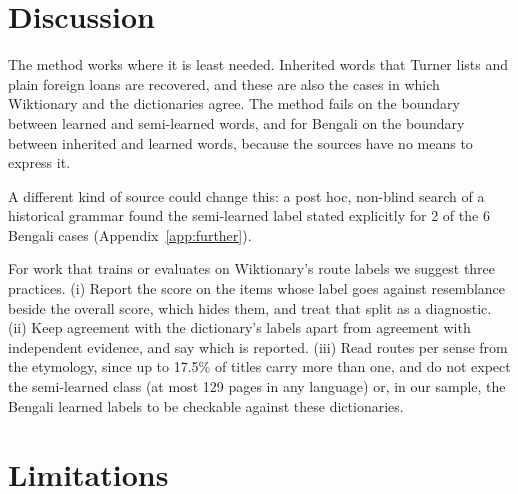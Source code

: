\documentclass[11pt]{article}
\begin{document}
\section{Discussion}

The method works where it is least needed. Inherited words that Turner lists and plain foreign loans are recovered, and these are also the cases in which Wiktionary and the dictionaries agree. The method fails on the boundary between learned and semi-learned words, and for Bengali on the boundary between inherited and learned words, because the sources have no means to express it.

A different kind of source could change this: a post hoc, non-blind search of a historical grammar found the semi-learned label stated explicitly for 2 of the 6 Bengali cases (Appendix~\ref{app:further}).

For work that trains or evaluates on Wiktionary's route labels we suggest three practices. (i) Report the score on the items whose label goes against resemblance beside the overall score, which hides them, and treat that split as a diagnostic. (ii) Keep agreement with the dictionary's labels apart from agreement with independent evidence, and say which is reported. (iii) Read routes per sense from the etymology, since up to 17.5\% of titles carry more than one, and do not expect the semi-learned class (at most 129 pages in any language) or, in our sample, the Bengali learned labels to be checkable against these dictionaries.

\section*{Limitations}
\end{document}
